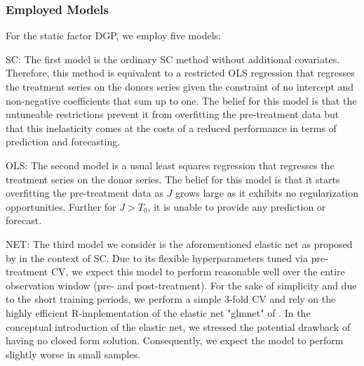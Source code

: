 \subsubsection{Employed Models}
For the static factor \ac{DGP}, we employ five models: 

SC: The first model is the ordinary \ac{SC} method without additional covariates. Therefore, this method is equivalent to a restricted \ac{OLS} regression that regresses the treatment series on the donors series given the constraint of no intercept and non-negative coefficients that sum up to one. The belief for this model is that the untuneable restrictions prevent it from overfitting the pre-treatment data but that this inelasticity comes at the costs of a reduced performance in terms of prediction and forecasting.

OLS: The second model is a usual least squares regression that regresses the treatment series on the donor series. The belief for this model is that it starts overfitting the pre-treatment data as $J$ grows large as it exhibits no regularization opportunities. Further for $J > T_0$, it is unable to provide any prediction or forecast.

NET: The third model we consider is the aforementioned elastic net as proposed by \cite{doudchenko:2016} in the context of \ac{SC}. Due to its flexible hyperparameters tuned via pre-treatment \ac{CV}, we expect this model to perform reasonable well over the entire observation window (pre- and post-treatment). For the sake of simplicity and due to the short training periods, we perform a simple 3-fold \ac{CV} and rely on the highly efficient R-implementation of the elastic net "glmnet" of \cite{friedman:2010}. In the conceptual introduction of the elastic net, we stressed the potential drawback of having no closed form solution. Consequently, we expect the model to perform slightly worse in small samples.

